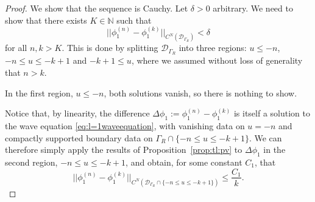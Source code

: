 \documentclass[11pt,english]{article}
\numberwithin{equation}{section}
\theoremstyle{remark}
\theoremstyle{plain}
\theoremstyle{remark}
\renewcommand{\(}{\left(}
\renewcommand{\)}{\right)}
\begin{document}
\begin{proof}
We show that the sequence is Cauchy. Let $\delta>0$ arbitrary. We need to show that there exists $K\in\mathbb{N}$ such that
\begin{equation}\label{eq:tl:nu}
||\phi_1^{(n)}-\phi_1^{(k)}||_{C^N(\mathcal{D}_{\Gamma_R})}<\delta
\end{equation}
for all $n,k>K$. 
This is done by splitting $\mathcal{D}_{\Gamma_R}$ into three regions: $u\leq -n$, $-n\leq u\leq -k+1$ and $-k+1\leq u$, where we assumed without loss of generality that $n>k$. 

In the first region, $u\leq -n$, both solutions vanish, so there is nothing to show. 

Notice that, by linearity, the difference $\Delta\phi_1:=\phi_1^{(n)}-\phi_1^{(k)}$ is itself a solution to the wave equation \eqref{eq:l=1waveequation}, with vanishing data on $u=-n$ and compactly supported boundary data on $\Gamma_R\cap\{-n\leq u\leq -k+1\}$. 
We can therefore simply apply the results of Proposition~\ref{prop:tl:pv} to $\Delta\phi_1$ in the second region, $-n\leq u\leq -k+1$, and obtain, for some constant $C_1$, that
\begin{equation}\label{eq:tl:nuk}
||\phi_1^{(n)}-\phi_1^{(k)}||_{C^N(\mathcal{D}_{\Gamma_R}\cap\{-n\leq u\leq -k+1\})}\leq \frac{C_1}{k}.
\end{equation}


\end{proof}
\end{document}
